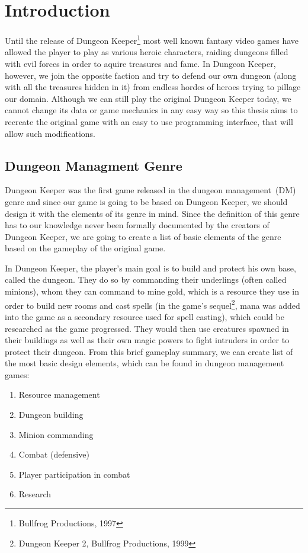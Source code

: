 \chapter{Introduction}

Until the release of Dungeon Keeper\footnote{Bullfrog Productions, 1997} most well known fantasy 
video games have allowed the player to play as various heroic characters, raiding dungeons filled
with evil forces in order to aquire treasures and fame.
In Dungeon Keeper, however, we join the opposite faction and try to defend our own dungeon
(along with all the treasures hidden in it) from endless hordes of heroes trying to pillage our domain.
Although we can still play the original Dungeon Keeper today, we cannot change its data or game mechanics
in any easy way so this thesis aims to recreate the original game with an easy to use programming interface,
that will allow such modifications.

\section{Dungeon Managment Genre}

Dungeon Keeper was the first game released in the dungeon management~(DM) genre and since our game is going to be based on
Dungeon Keeper, we should design it with the elements of its genre in mind. Since the definition of this genre has to our
knowledge never been formally documented by the creators of Dungeon Keeper, we are going to create a list of basic elements
of the genre based on the gameplay of the original game.

In Dungeon Keeper, the player's main goal is to build and protect his own base, called the dungeon. They do so by commanding
their underlings (often called minions), whom they can command to mine gold, which is a resource they use in order to build new rooms
and cast spells (in the game's sequel\footnote{Dungeon Keeper 2, Bullfrog Productions, 1999}, mana was added into the game
as a secondary resource used for spell casting), which could be researched as the game progressed. They would then use creatures
spawned in their buildings as well as their own magic powers to fight intruders in order to protect their dungeon. 
From this brief gameplay summary, we can create list of the most basic design elements, which can be found in dungeon management games:

\begin{enumerate}[label=\textbf{(E\arabic*)}]
    \item Resource management
    \item Dungeon building
    \item Minion commanding
    \item Combat (defensive)
    \item Player participation in combat
    \item Research
\end{enumerate}


